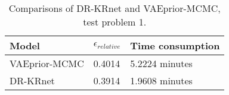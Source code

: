
\begin{table}
		\caption{Comparisons of DR-KRnet and VAEprior-MCMC, test problem 1.}
		\label{test1}
		\centering
		\begin{tabular}{lll}
			\toprule
			 Model&  $\epsilon_{relative}$ &Time consumption\\
			\midrule
			VAEprior-MCMC &0.4014& 5.2224 minutes\\
			DR-KRnet & 0.3914&1.9608 minutes\\
			\bottomrule
		\end{tabular}
\end{table}

